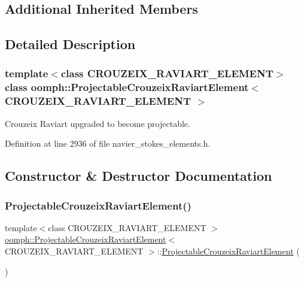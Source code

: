 \subsection*{Additional Inherited Members}


\subsection{Detailed Description}
\subsubsection*{template$<$class C\+R\+O\+U\+Z\+E\+I\+X\+\_\+\+R\+A\+V\+I\+A\+R\+T\+\_\+\+E\+L\+E\+M\+E\+NT$>$\newline
class oomph\+::\+Projectable\+Crouzeix\+Raviart\+Element$<$ C\+R\+O\+U\+Z\+E\+I\+X\+\_\+\+R\+A\+V\+I\+A\+R\+T\+\_\+\+E\+L\+E\+M\+E\+N\+T $>$}

Crouzeix Raviart upgraded to become projectable. 

Definition at line 2936 of file navier\+\_\+stokes\+\_\+elements.\+h.



\subsection{Constructor \& Destructor Documentation}
\mbox{\label{classoomph_1_1ProjectableCrouzeixRaviartElement_a3475345b8d605f73710a2dde57029985}} 
\subsubsection{\texorpdfstring{Projectable\+Crouzeix\+Raviart\+Element()}{ProjectableCrouzeixRaviartElement()}}
{\footnotesize\ttfamily template$<$class C\+R\+O\+U\+Z\+E\+I\+X\+\_\+\+R\+A\+V\+I\+A\+R\+T\+\_\+\+E\+L\+E\+M\+E\+NT $>$ \\
\hyperlink{classoomph_1_1ProjectableCrouzeixRaviartElement}{oomph\+::\+Projectable\+Crouzeix\+Raviart\+Element}$<$ C\+R\+O\+U\+Z\+E\+I\+X\+\_\+\+R\+A\+V\+I\+A\+R\+T\+\_\+\+E\+L\+E\+M\+E\+NT $>$\+::\hyperlink{classoomph_1_1ProjectableCrouzeixRaviartElement}{Projectable\+Crouzeix\+Raviart\+Element} (\begin{DoxyParamCaption}{ }\end{DoxyParamCaption})\hspace{0.3cm}{\ttfamily [inline]}}



